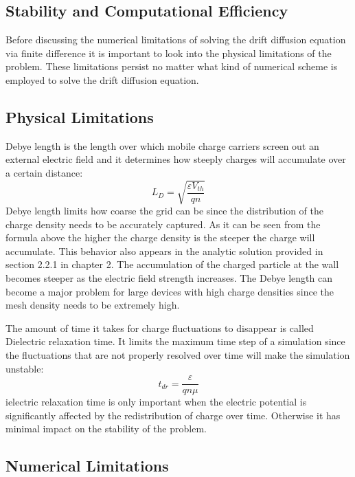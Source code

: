 \begin{doublespace}
\section{Stability and Computational Efficiency}
Before discussing  the numerical limitations of solving the drift diffusion equation via finite difference it is important to look into the physical limitations of the problem. These limitations persist no matter what kind of numerical scheme is employed to solve the drift diffusion equation.

\subsection{Physical Limitations}
 Debye length is the length over which mobile charge carriers screen out an external electric field and it determines how steeply charges will accumulate over a certain distance\cite{Dragica1}:
\begin{equation}
L_D=\sqrt{\frac{\varepsilon V_{th}}{q n}}
\label{debye}
\end{equation}
 Debye length limits how coarse the grid can be since the distribution of the charge density needs to be accurately captured. As it can be seen from the formula above the higher the charge density is the steeper the charge will accumulate. This behavior  also appears in the analytic solution provided in section 2.2.1 in chapter 2. The accumulation of the charged particle at the wall becomes steeper as the electric field strength increases. The Debye length can become a major problem for large devices with high charge densities since the mesh density needs to be extremely high.

The amount of time it takes for charge fluctuations to disappear is called Dielectric relaxation time. It limits the maximum time step of a simulation since the fluctuations that are not properly resolved over time will make the simulation unstable\cite{Dragica1}:
\begin{equation}
t_{dr}=\frac{\varepsilon}{q n \mu}
\label{tdr}
\end{equation}
ielectric relaxation time is only important when the electric potential is significantly affected by the redistribution of charge over time. Otherwise it has minimal impact on the stability of the problem.

\subsection{Numerical Limitations}


\end{doublespace}
